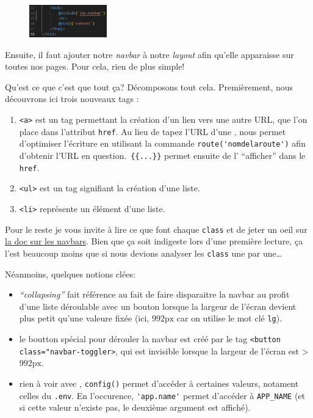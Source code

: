 \begin{figure}
    \vspace{-0.5cm}
    \includegraphics[width=0.3\textwidth]{figures-C1/navbar_layout.pdf}
\end{figure}

Ensuite, il faut ajouter notre \textit{navbar} à notre \textit{layout} afin qu'elle apparaisse sur toutes nos pages. Pour cela, rien de plus simple! 
\vspace{2cm}

\newpage

Qu'est ce que c'est que tout ça? Décomposons tout cela.
Premièrement, nous découvrons ici trois nouveaux tags \html{}:
\begin{enumerate}
    \item \verb|<a>| est un tag permettant la création d'un lien vers une autre URL, que l'on place dans l'attribut \verb|href|. Au lieu de tapez l'URL d'une \route{}, \laravel{} nous permet d'optimiser l'écriture en utilisant la commande \verb|route('nomdelaroute')| afin d'obtenir l'URL en question.~\verb|{{...}}| permet ensuite de l' ``afficher'' dans le \verb|href|.
    \item \verb|<ul>| est un tag signifiant la création d'une liste.
    \item \verb|<li>| représente un élément d'une liste.
\end{enumerate}

Pour le reste je vous invite à lire ce que font chaque \verb|class| et de jeter un oeil sur \href{https://getbootstrap.com/docs/5.3/components/navbar/}{la doc \bs{} sur les navbars}. Bien que ça soit indigeste lors d'une première lecture, ça l'est beaucoup moins que si nous devions analyser les \verb|class| une par une\ldots

Néanmoins, quelques notions clées: 
\begin{itemize}
    \item \textit{``collapsing''} fait référence au fait de faire disparaitre la navbar au profit d'une liste déroulable avec un bouton lorsque la largeur de l'écran devient plus petit qu'une valeure fixée (ici, $992\mathrm{px}$ car on utilise le mot clé \verb|lg|).
    \item le boutton spécial pour dérouler la navbar est créé par le tag \verb|<button class="navbar-toggler>|, qui est invisible lorsque la largeur de l'écran est > $992\mathrm{px}$.
    \item rien à voir avec \bs{}, \verb|config()| permet d'accéder à certaines valeurs, notament celles du \verb|.env|. En l'occurence, \verb|'app.name'| permet d'accéder à \verb|APP_NAME| (et si cette valeur n'existe pas, le deuxième argument est affiché).
\end{itemize}

